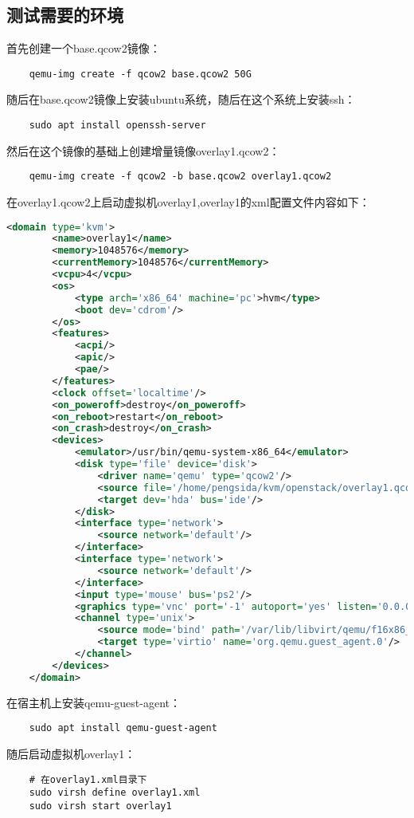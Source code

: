 \documentclass[a4paper,left=1.5cm,right=1.5cm,11pt]{article}
\begin{document}
\subsection{测试需要的环境}
	首先创建一个base.qcow2镜像：
	\begin{lstlisting}
	qemu-img create -f qcow2 base.qcow2 50G
	\end{lstlisting}

	随后在base.qcow2镜像上安装ubuntu系统，随后在这个系统上安装ssh：
	\begin{lstlisting}
	sudo apt install openssh-server
	\end{lstlisting}

	然后在这个镜像的基础上创建增量镜像overlay1.qcow2：
	\begin{lstlisting}
	qemu-img create -f qcow2 -b base.qcow2 overlay1.qcow2
	\end{lstlisting}

	在overlay1.qcow2上启动虚拟机overlay1,overlay1的xml配置文件内容如下：
	\begin{lstlisting}[language = xml]
	<domain type='kvm'>
		<name>overlay1</name>
		<memory>1048576</memory>
		<currentMemory>1048576</currentMemory>
		<vcpu>4</vcpu>
		<os>
			<type arch='x86_64' machine='pc'>hvm</type>
			<boot dev='cdrom'/>
		</os>
		<features>
			<acpi/>
			<apic/>
			<pae/>
		</features>
		<clock offset='localtime'/>
		<on_poweroff>destroy</on_poweroff>
		<on_reboot>restart</on_reboot>
		<on_crash>destroy</on_crash>
		<devices>
			<emulator>/usr/bin/qemu-system-x86_64</emulator>
			<disk type='file' device='disk'>
				<driver name='qemu' type='qcow2'/>
				<source file='/home/pengsida/kvm/openstack/overlay1.qcow2'/>
				<target dev='hda' bus='ide'/>
			</disk>
			<interface type='network'>
				<source network='default'/>
			</interface>
			<interface type='network'>
				<source network='default'/>
			</interface>
			<input type='mouse' bus='ps2'/>
			<graphics type='vnc' port='-1' autoport='yes' listen='0.0.0.0' keymap='en-us'/>
			<channel type='unix'>
				<source mode='bind' path='/var/lib/libvirt/qemu/f16x86_64.agent'/>
				<target type='virtio' name='org.qemu.guest_agent.0'/>
			</channel>
		</devices>
	</domain>
	\end{lstlisting}

	在宿主机上安装qemu-guest-agent：
	\begin{lstlisting}
	sudo apt install qemu-guest-agent
	\end{lstlisting}

	随后启动虚拟机overlay1：
	\begin{lstlisting}
	# 在overlay1.xml目录下
	sudo virsh define overlay1.xml
	sudo virsh start overlay1
	\end{lstlisting}
\end{document}
